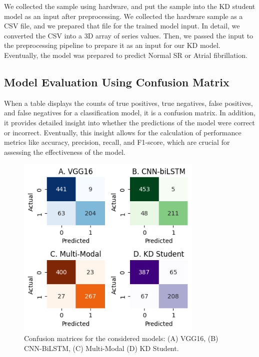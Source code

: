 \documentclass[conference]{IEEEtran}
\begin{document}
We collected the sample using hardware, and put the sample into the KD student model as an input after preprocessing. We collected the hardware sample as a CSV file, and we prepared that file for the trained model input. In detail, we converted the CSV into a 3D array of series values. Then, we passed the input to the preprocessing pipeline to prepare it as an input for our KD model. Eventually, the model was prepared to predict Normal SR or Atrial fibrillation. 

\subsection{Model Evaluation Using Confusion Matrix}

When a table displays the counts of true positives, true negatives, false positives, and false negatives for a classification model, it is a confusion matrix. In addition, it provides detailed insight into whether the predictions of the model were correct or incorrect. Eventually, this insight allows for the calculation of performance metrics like accuracy, precision, recall, and F1-score, which are crucial for assessing the effectiveness of the model.

\begin{figure}[htbp]
\centerline{\includegraphics[width=3.5in]{15-Confusion Matrix.png}}
\caption{Confusion matrices for the considered models: (A) VGG16, (B) CNN-BiLSTM, (C) Multi-Modal (D) KD Student.}
\label{fig-15:CM}
\end{figure}
\end{document}
